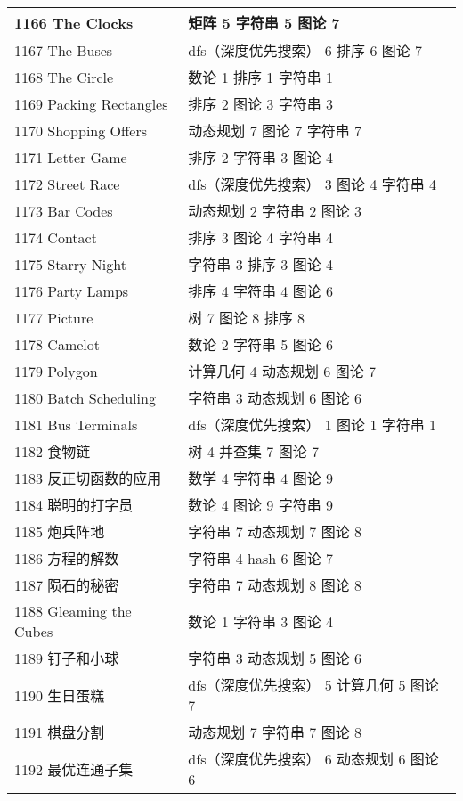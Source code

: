 \begin{longtable}{| p{} | p{} |}
 1166 The Clocks  & 矩阵 5 字符串 5 图论 7 \\ \hline
 1167 The Buses  & dfs（深度优先搜索） 6 排序 6 图论 7 \\ \hline
 1168 The Circle  & 数论 1 排序 1 字符串 1 \\ \hline
 1169 Packing Rectangles  & 排序 2 图论 3 字符串 3 \\ \hline
 1170 Shopping Offers  & 动态规划 7 图论 7 字符串 7 \\ \hline
 1171 Letter Game  & 排序 2 字符串 3 图论 4 \\ \hline
 1172 Street Race  & dfs（深度优先搜索） 3 图论 4 字符串 4 \\ \hline
 1173 Bar Codes  & 动态规划 2 字符串 2 图论 3 \\ \hline
 1174 Contact  & 排序 3 图论 4 字符串 4 \\ \hline
 1175 Starry Night  & 字符串 3 排序 3 图论 4 \\ \hline
 1176 Party Lamps  & 排序 4 字符串 4 图论 6 \\ \hline
 1177 Picture  & 树 7 图论 8 排序 8 \\ \hline
 1178 Camelot  & 数论 2 字符串 5 图论 6 \\ \hline
 1179 Polygon  & 计算几何 4 动态规划 6 图论 7 \\ \hline
 1180 Batch Scheduling  & 字符串 3 动态规划 6 图论 6 \\ \hline
 1181 Bus Terminals  & dfs（深度优先搜索） 1 图论 1 字符串 1 \\ \hline
 1182 食物链  & 树 4 并查集 7 图论 7 \\ \hline
 1183 反正切函数的应用  & 数学 4 字符串 4 图论 9 \\ \hline
 1184 聪明的打字员  & 数论 4 图论 9 字符串 9 \\ \hline
 1185 炮兵阵地  & 字符串 7 动态规划 7 图论 8 \\ \hline
 1186 方程的解数  & 字符串 4 hash 6 图论 7 \\ \hline
 1187 陨石的秘密  & 字符串 7 动态规划 8 图论 8 \\ \hline
 1188 Gleaming the Cubes  & 数论 1 字符串 3 图论 4 \\ \hline
 1189 钉子和小球  & 字符串 3 动态规划 5 图论 6 \\ \hline
 1190 生日蛋糕  & dfs（深度优先搜索） 5 计算几何 5 图论 7 \\ \hline
 1191 棋盘分割  & 动态规划 7 字符串 7 图论 8 \\ \hline
 1192 最优连通子集  & dfs（深度优先搜索） 6 动态规划 6 图论 6 \\ \hline

\end{longtable}
